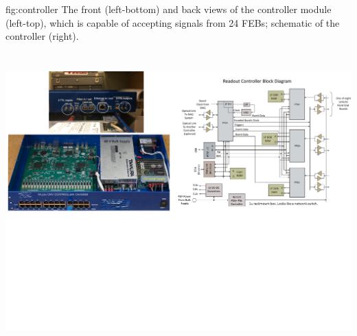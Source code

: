 

\begin{dunefigure}
 {fig:controller}
 {The front (left-bottom) and back views of the controller module (left-top), which is capable of accepting signals from 24 FEBs; schematic of the controller (right).}
\includegraphics[height=4.8in]{graphics/pds-controller.pdf} 
\vspace{-5.5cm}
\end{dunefigure}


